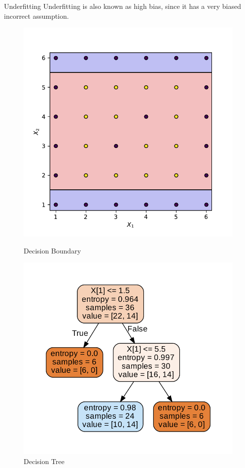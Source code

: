\documentclass{beamer}
\begin{document}
	\begin{frame}{Underfitting}
	Underfitting is also known as high bias, since it has a very biased incorrect assumption.
	\begin{figure}[h]
	    \centering
	    \begin{minipage}{0.45\textwidth}
	        \centering
	        \includegraphics[width=\textwidth]{example-2-depth-1-boundary}
	        \caption{Decision Boundary}
	    \end{minipage}
	    \hfill
	    \begin{minipage}{0.45\textwidth}
	        \centering
	        \includegraphics[width=\textwidth]{example-2-depth-1-decision-tree}
	        \caption{Decision Tree}
	    \end{minipage}
	\end{figure}
	\end{frame}
\end{document}
